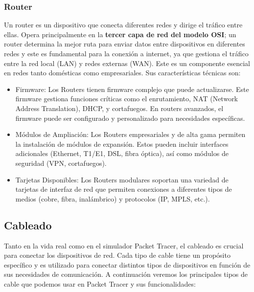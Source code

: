 \documentclass{article}
\begin{document}
\subsubsection{Router}
Un router es un dispositivo que conecta diferentes redes y dirige el tráfico entre ellas. Opera principalmente en la \textbf{tercer capa de red del modelo OSI}; un router determina la mejor ruta para enviar datos entre dispositivos en diferentes redes y este es fundamental para la conexión a internet, ya que gestiona el tráfico entre la red local (LAN) y redes externas (WAN). Este es un componente esencial en redes tanto domésticas como empresariales. Sus características técnicas son:

\begin{itemize}
    \item Firmware: Los Routers tienen firmware complejo que puede actualizarse. Este firmware gestiona funciones críticas como el enrutamiento, NAT (Network Address Translation), DHCP, y cortafuegos. En routers avanzados, el firmware puede ser configurado y personalizado para necesidades específicas.
    \item Módulos de Ampliación: Los Routers empresariales y de alta gama permiten la instalación de módulos de expansión. Estos pueden incluir interfaces adicionales (Ethernet, T1/E1, DSL, fibra óptica), así como módulos de seguridad (VPN, cortafuegos).
    \item Tarjetas Disponibles: Los Routers modulares soportan una variedad de tarjetas de interfaz de red que permiten conexiones a diferentes tipos de medios (cobre, fibra, inalámbrico) y protocolos (IP, MPLS, etc.).
\end{itemize}


\subsection{Cableado}
Tanto en la vida real como en el simulador Packet Tracer, el cableado es crucial para conectar los dispositivos de red. Cada tipo de cable tiene un propósito específico y es utilizado para conectar distintos tipos de dispositivos en función de sus necesidades de comunicación. A continuación veremos los principales tipos de cable que podemos usar en Packet Tracer y sus funcionalidades: 
\end{document}
